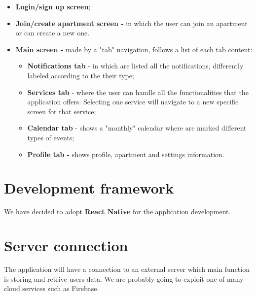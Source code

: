 \documentclass[]{article}
\begin{document}
	\begin{itemize}
		\item \textbf{Login/sign up screen};
		\item \textbf{Join/create apartment screen -} in which the user can join an apartment 
		or can create a new one.
		\item \textbf{Main screen -} made by a "tab" navigation, follows a list of each tab content:  
		\begin{itemize}
			\item \textbf{Notifications tab} - in which are listed all the notifications, 
			differently labeled according to the their type;
			\item \textbf{Services tab} - where the user can handle all the functionalities that
			the application offers. Selecting one service will navigate to a new specific screen for that service;
			\item \textbf{Calendar tab} - shows a "monthly" calendar where are marked different types of events;
			\item \textbf{Profile tab -} shows profile, apartment and settings information.
		\end{itemize}
			
	\end{itemize}

	\section{Development framework}
	We have decided to adopt \textbf{React Native} for the application development.

	\section{Server connection}
	
	The application will have a connection to an external server which main function is storing and retrive users data. We are probably going to exploit one of many cloud services such as Firebase. 
\end{document}
